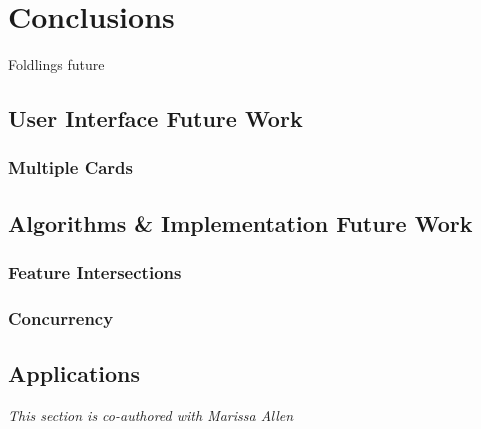 \chapter{Conclusions}

Foldlings future

\section{User Interface Future Work}\label{user-interface-future-work}

\subsection{Multiple Cards}\label{multiple-cards}

\section{Algorithms \& Implementation Future
Work}\label{algorithms-implementation-future-work}

\subsection{Feature Intersections}\label{feature-intersections}

\subsection{Concurrency}\label{concurrency}

\section{Applications}\label{applications}

\emph{This section is co-authored with Marissa Allen}
